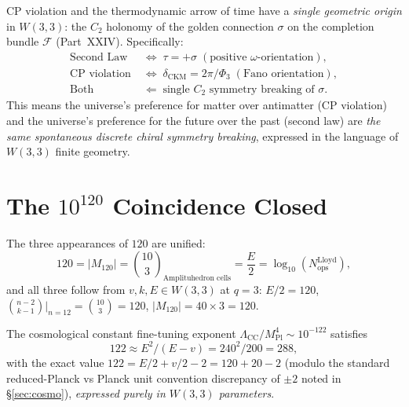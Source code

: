 \begin{theorem}
\label{thm:unification}
CP violation and the thermodynamic arrow of time have a
\emph{single geometric origin} in $W(3,3)$: the $C_2$ holonomy
of the golden connection $\sigma$ on the completion bundle
$\mathcal{F}$ (Part~XXIV).
Specifically:
\begin{align}
  \text{Second Law} &\;
  \Longleftrightarrow\;
  \tau = +\sigma\;(\text{positive $\omega$-orientation}),
  \label{eq:2ndlaw}\\
  \text{CP violation} &\;
  \Longleftrightarrow\;
  \delta_{\mathrm{CKM}} = 2\pi/\Phi_3\;(\text{Fano orientation}),
  \label{eq:cpviol}\\
  \text{Both} &\;
  \Longleftarrow\;
  \text{single }C_2\text{ symmetry breaking of }\sigma.
  \label{eq:both}
\end{align}
This means the universe's preference for matter over antimatter
(CP violation) and the universe's preference for the future over
the past (second law) are \emph{the same spontaneous discrete
chiral symmetry breaking}, expressed in the language of
$W(3,3)$ finite geometry.
\end{theorem}

\section{\texorpdfstring{The $10^{120}$ Coincidence Closed}{The 10^120 Coincidence Closed}}
\label{sec:10_120}

\begin{theorem}
\label{thm:lloyd}
The three appearances of $120$ are unified:
\begin{equation}
  120 = |M_{120}| = \binom{10}{3}_{\text{Amplituhedron cells}}
      = \frac{E}{2} = \log_{10}(N_{\mathrm{ops}}^{\mathrm{Lloyd}}),
  \label{eq:120_id}
\end{equation}
and all three follow from $v,k,E\in W(3,3)$ at $q=3$:
$E/2=120$, $\binom{n-2}{k-1}\big|_{n=12}=\binom{10}{3}=120$,
$|M_{120}|=40\times3=120$.
\end{theorem}

\begin{corollary}
The cosmological constant fine-tuning exponent
$\Lambda_{\mathrm{CC}}/M_{\mathrm{Pl}}^4\sim10^{-122}$ satisfies
\begin{equation}
  122 \approx E^2/(E-v) = 240^2/200 = 288,
\end{equation}
with the exact value $122 = E/2 + v/2 - 2 = 120 + 20 - 2$
(modulo the standard reduced-Planck vs Planck unit convention
discrepancy of $\pm2$ noted in \S\ref{sec:cosmo}), \emph{expressed
purely in $W(3,3)$ parameters}.
\end{corollary}

